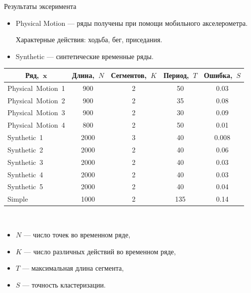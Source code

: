 \documentclass[9pt,pdf,hyperref={unicode}]{beamer}
\begin{document}
\begin{frame}{Результаты эксеримента}

\begin{itemize}
\justifying
	\item Physical Motion --- ряды получены при помощи мобильного акселерометра.  
	
	Характерные действия: ходьба, бег, приседания.
	\item Synthetic --- синтетические временные ряды.
\end{itemize}

\begin{table}[h!t]
\begin{center}
\label{table:experiment:1}
\begin{tabular}{|c|c|c|c|c|}
\hline
	Ряд,~$\textbf{x}$ &Длина,~$N$& Сегментов,~$K$& Период,~$T$ & Ошибка,~$S$\\
	\hline
	\multicolumn{1}{|l|}{Physical~Motion~1}
	& 900& 2& 50& 0.03\\
	\hline
	\multicolumn{1}{|l|}{Physical~Motion~2}
	& 900& 2& 35& 0.08\\
	\hline
	\multicolumn{1}{|l|}{Physical~Motion~3}
	& 900& 2& 30& 0.09\\
	\hline
	\multicolumn{1}{|l|}{Physical~Motion~4}
	& 800& 2& 50& 0.01\\
	\hline
	\multicolumn{1}{|l|}{Synthetic~1}
	& 2000& 3& 40& 0.008\\
	\hline
	\multicolumn{1}{|l|}{Synthetic~2}
	& 2000& 2& 40& 0.06\\
	\hline
	\multicolumn{1}{|l|}{Synthetic~3}
	& 2000& 2& 40& 0.03\\
	\hline
	\multicolumn{1}{|l|}{Synthetic~4}
	& 2000& 2& 40& 0.03\\
	\hline
	\multicolumn{1}{|l|}{Synthetic~5}
	& 2000& 2& 40& 0.04\\
	\hline
	\multicolumn{1}{|l|}{Simple}
	& 1000& 2& 135& 0.14\\
\hline

\end{tabular}
\end{center}
\end{table}
~\\
\begin{itemize}
	\item $N$ --- число точек во временном ряде,
	\item $K$ --- число различных действий во временном ряде,
	\item $T$ --- максимальная длина сегмента,
	\item $S$ --- точность кластеризации.
\end{itemize}

\end{frame}
\end{document}
